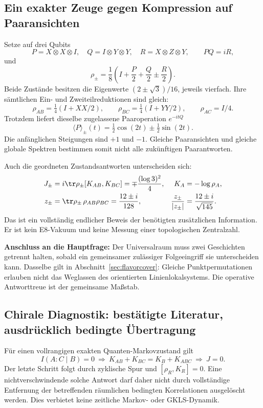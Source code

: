\subsection{Ein exakter Zeuge gegen Kompression auf Paaransichten}
Setze auf drei Qubits
\begin{equation}
P=X\otimes X\otimes I,\quad Q=I\otimes Y\otimes Y,\quad
R=X\otimes Z\otimes Y,\qquad PQ=iR,
\end{equation}
und
\begin{equation}
\rho_\pm=\frac18\left(I+\frac P2+\frac Q2\pm\frac R2\right).
\end{equation}
Beide Zustände besitzen die Eigenwerte $(2\pm\sqrt3)/16$, jeweils vierfach. Ihre sämtlichen Ein- und Zweiteilreduktionen sind gleich:
\begin{equation}
\rho_{AB}=\tfrac14(I+XX/2),\qquad
\rho_{BC}=\tfrac14(I+YY/2),\qquad \rho_{AC}=I/4.
\end{equation}
Trotzdem liefert dieselbe zugelassene Paaroperation $e^{-itQ}$
\begin{equation}
\langle P\rangle_\pm(t)=\tfrac12\cos(2t)\pm\tfrac12\sin(2t).
\end{equation}
Die anfänglichen Steigungen sind $+1$ und $-1$. Gleiche Paaransichten und gleiche globale Spektren bestimmen somit nicht alle zukünftigen Paarantworten.

Auch die geordneten Zustandsantworten unterscheiden sich:
\begin{align}
J_\pm&=i\tr\rho_\pm[K_{AB},K_{BC}]
=\mp\frac{(\log3)^2}{4},
&K_A&=-\log\rho_A,\\
z_\pm&=\tr\rho_\pm\,\rho_{AB}\rho_{BC}
=\frac{12\pm i}{128},
&\frac{z_\pm}{|z_\pm|}&=\frac{12\pm i}{\sqrt{145}}.
\end{align}
Das ist ein vollständig endlicher Beweis der benötigten zusätzlichen Information. Er ist kein E8-Vakuum und keine Messung einer topologischen Zentralzahl.

\textbf{Anschluss an die Hauptfrage:} Der Universalraum muss zwei Geschichten getrennt halten, sobald ein gemeinsamer zulässiger Folgeeingriff sie unterscheiden kann. Dasselbe gilt in Abschnitt~\ref{sec:flavorcover}: Gleiche Punktpermutationen erlauben nicht das Weglassen des orientierten Linienlokalsystems. Die operative Antworttreue ist der gemeinsame Maßstab.

\subsection{Chirale Diagnostik: bestätigte Literatur, ausdrücklich bedingte Übertragung}
Für einen vollrangigen exakten Quanten-Markovzustand gilt
\begin{equation}
I(A:C\mid B)=0
\ \Longrightarrow\
K_{AB}+K_{BC}=K_B+K_{ABC}
\ \Longrightarrow\ J=0.
\end{equation}
Der letzte Schritt folgt durch zyklische Spur und $[\rho_R,K_R]=0$. Eine nichtverschwindende solche Antwort darf daher nicht durch vollständige Entfernung der betreffenden räumlichen bedingten Korrelationen ausgelöscht werden. Dies verbietet keine zeitliche Markov- oder GKLS-Dynamik.

